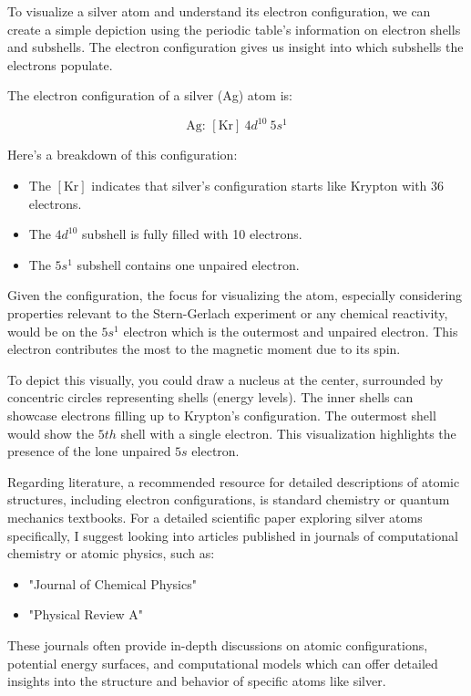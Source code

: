 \begin{airesult}
To visualize a silver atom and understand its electron configuration, we can create a simple
depiction using the periodic table's information on electron shells and subshells. The electron
configuration gives us insight into which subshells the electrons populate.

The electron configuration of a silver (Ag) atom is:

\vsp

\[
\text{Ag: } [\text{Kr}] \ 4d^{10} \ 5s^1
\]
\vsp

Here's a breakdown of this configuration:

\begin{itemize}
\item The \([ \text{Kr} ]\) indicates that silver's configuration starts like Krypton with 36
electrons.
\item The \(4d^{10}\) subshell is fully filled with 10 electrons.
\item The \(5s^1\) subshell contains one unpaired electron.
\end{itemize}

Given the configuration, the focus for visualizing the atom, especially considering properties
relevant to the Stern-Gerlach experiment or any chemical reactivity, would be on the \(5s^1\)
electron which is the outermost and unpaired electron. This electron contributes the most to the
magnetic moment due to its spin.

To depict this visually, you could draw a nucleus at the center, surrounded by concentric circles
representing shells (energy levels). The inner shells can showcase electrons filling up to Krypton's
configuration. The outermost shell would show the \(5th\) shell with a single electron. This
visualization highlights the presence of the lone unpaired \(5s\) electron.

\vsp

Regarding literature, a recommended resource for detailed descriptions of atomic structures,
including electron configurations, is standard chemistry or quantum mechanics textbooks. For a
detailed scientific paper exploring silver atoms specifically, I suggest looking into articles
published in journals of computational chemistry or atomic physics, such as:

\begin{itemize}
\item "Journal of Chemical Physics"
\item "Physical Review A"
\end{itemize}

These journals often provide in-depth discussions on atomic configurations, potential energy
surfaces, and computational models which can offer detailed insights into the structure and behavior
of specific atoms like silver.
\end{airesult}


